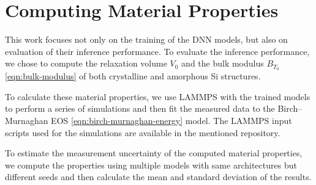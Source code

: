 \section{Computing Material Properties}

This work focuses not only on the training of the DNN models, but also on
evaluation of their inference performance. To evaluate the inference
performance, we chose to compute the relaxation volume $V_0$ and the bulk
modulus $B_{T_0}$ \eqref{eqn:bulk-modulus} of both crystalline and amorphous
Si structures.

To calculate these material properties, we use LAMMPS with the trained models
to perform a series of simulations and then fit the measured data to the
Birch--Murnaghan EOS \eqref{eqn:birch-murnaghan-energy} model. The LAMMPS
input scripts used for the simulations are available in the mentioned
repository.

To estimate the measurement uncertainty of the computed material properties,
we compute the properties using multiple models with same architectures but
different seeds and then calculate the mean and standard deviation of the
results.
